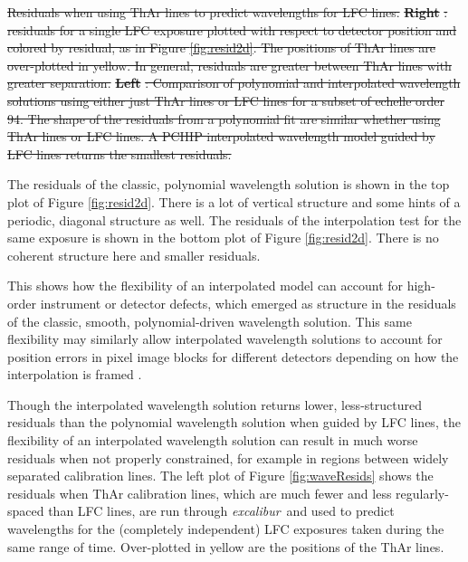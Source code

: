 \documentclass[twocolumn,table,xcolor,trackchanges]{aastex63} %
\newcommand{\project}[1]{\textsl{#1}}
\newcommand{\name}{\project{excalibur}}
\providecommand{\DIFdel}[1]{{\protect\color{red}\sout{#1}}}                      %
\providecommand{\DIFdelbegin}{} %
\providecommand{\DIFdelend}{} %
\providecommand{\DIFdelFL}[1]{\DIFdel{#1}} %
\begin{document}
\DIFdelbegin %
{%
\DIFdelFL{Residuals when using ThAr lines to predict wavelengths for LFC lines.  }\textbf{\DIFdelFL{Right}}%
\DIFdelFL{: residuals for a single LFC exposure plotted with respect to detector position and colored by residual, as in Figure \ref{fig:resid2d}.  The positions of ThAr lines are over-plotted in yellow.  In general, residuals are greater between ThAr lines with greater separation.
}\textbf{\DIFdelFL{Left}}%
\DIFdelFL{: Comparison of polynomial and interpolated wavelength solutions using either just ThAr lines or LFC lines for a subset of echelle order 94.  The shape of the residuals from a polynomial fit are similar whether using ThAr lines or LFC lines.  A PCHIP interpolated wavelength model guided by LFC lines returns the smallest residuals.}}

\DIFdelend The residuals of the classic, polynomial wavelength solution is shown in the top plot of Figure \ref{fig:resid2d}.  There is a lot of vertical structure and some hints of a periodic, diagonal structure as well.  The residuals of the interpolation test for the same exposure is shown in the bottom plot of Figure \ref{fig:resid2d}.  There is no coherent structure here and smaller residuals. 

This shows how the flexibility of an interpolated model can account for high-order instrument or detector defects, which emerged as structure in the residuals of the classic, smooth, polynomial-driven wavelength solution.  This same flexibility may similarly allow interpolated wavelength solutions to account for position errors in pixel image blocks for different detectors depending on how the interpolation is framed \citep{fischer2016, milakovic2020}.

Though the interpolated wavelength solution returns lower, less-structured residuals than the polynomial wavelength solution when guided by LFC lines, the flexibility of an interpolated wavelength solution can result in much worse residuals when not properly constrained, for example in regions between widely separated calibration lines.  The left plot of Figure \ref{fig:waveResids} shows the residuals when ThAr calibration lines, which are much fewer and less regularly-spaced than LFC lines, are run through \name\ and used to predict wavelengths for the (completely independent) LFC exposures taken during the same range of time.  Over-plotted in yellow are the positions of the ThAr lines. 
\end{document}
